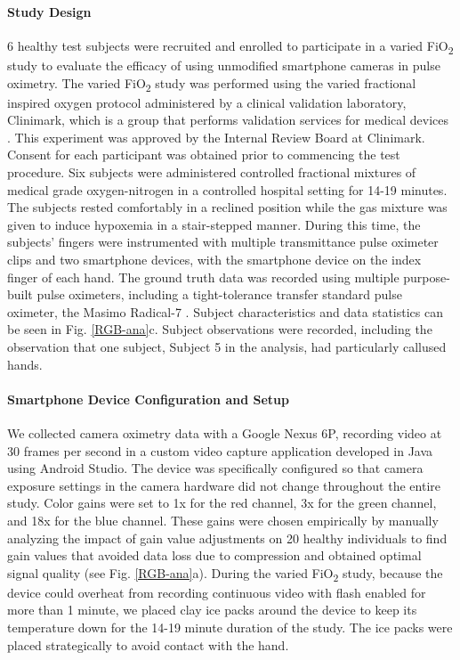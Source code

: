 \documentclass[12pt]{article}
\begin{document}
\paragraph*{Study Design}
    6 healthy test subjects were recruited and enrolled to participate in a varied FiO\textsubscript{2} study to evaluate the efficacy of using unmodified smartphone cameras in pulse oximetry.
	The varied FiO\textsubscript{2} study was performed using the varied fractional inspired oxygen protocol administered by a clinical validation laboratory, Clinimark, which is a group that performs validation services for medical devices \cite{clinimark2010pulse}. This experiment was approved by the Internal Review Board at Clinimark. Consent for each participant was obtained prior to commencing the test procedure. Six subjects were administered controlled fractional mixtures of medical grade oxygen-nitrogen in a controlled hospital setting for 14-19 minutes. The subjects rested comfortably in a reclined position while the gas mixture was given to induce hypoxemia in a stair-stepped manner. During this time, the subjects' fingers were instrumented with multiple transmittance pulse oximeter clips and two smartphone devices, with the smartphone device on the index finger of each hand. The ground truth data was recorded using multiple purpose-built pulse oximeters, including a tight-tolerance transfer standard pulse oximeter, the Masimo Radical-7 \cite{masimo7radical}. Subject characteristics and data statistics can be seen in Fig. \ref{RGB-ana}c. Subject observations were recorded, including the observation that one subject, Subject 5 in the analysis, had particularly callused hands.
	
\paragraph*{Smartphone Device Configuration and Setup}
	We collected camera oximetry data with a Google Nexus 6P, recording video at 30 frames per second in a custom video capture application developed in Java using Android Studio. The device was specifically configured so that camera exposure settings in the camera hardware did not change throughout the entire study. Color gains were set to 1x for the red channel, 3x for the green channel, and 18x for the blue channel. These gains were chosen empirically by manually analyzing the impact of gain value adjustments on 20 healthy individuals to find gain values that avoided data loss due to compression and obtained optimal signal quality (see Fig. \ref{RGB-ana}a). During the varied FiO\textsubscript{2} study, because the device could overheat from recording continuous video with flash enabled for more than 1 minute, we placed clay ice packs around the device to keep its temperature down for the 14-19 minute duration of the study. The ice packs were placed strategically to avoid contact with the hand.
\end{document}
